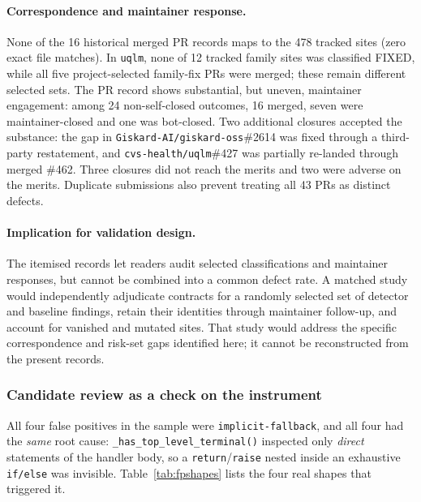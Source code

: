 \documentclass[10pt,a4paper]{article}
\begin{document}
\paragraph{Correspondence and maintainer response.}
None of the 16 historical merged PR records maps to the 478 tracked sites (zero
exact file matches). In \texttt{uqlm}, none of 12 tracked family sites was
classified FIXED, while all five project-selected family-fix PRs were
merged; these remain different selected sets. The PR record shows
substantial, but uneven, maintainer engagement: among 24 non-self-closed
outcomes, 16 merged, seven were maintainer-closed and one was bot-closed.
Two additional closures accepted the substance: the gap in
\texttt{Giskard-AI/giskard-oss}\#2614 was fixed through a third-party
restatement, and \texttt{cvs-health/uqlm}\#427 was partially re-landed
through merged \#462. Three closures did not reach the merits and two
were adverse on the merits. Duplicate submissions also prevent treating
all 43 PRs as distinct defects.

\paragraph{Implication for validation design.}
The itemised records let readers audit selected classifications and
maintainer responses, but cannot be combined into a common defect rate.
A matched study would independently adjudicate contracts for a randomly
selected set of detector and baseline findings, retain their identities
through maintainer follow-up, and account for vanished and mutated sites.
That study would address the specific correspondence and risk-set gaps
identified here; it cannot be reconstructed from the present records.

\subsubsection{Candidate review as a check on the instrument}
\label{sec:rq4}

All four false positives in the sample were \texttt{implicit-fallback}, and all
four had the \emph{same} root cause:
\texttt{\_has\_top\_level\_terminal()} inspected only \emph{direct} statements of
the handler body, so a \texttt{return}/\texttt{raise} nested inside an exhaustive
\texttt{if/else} was invisible. Table~\ref{tab:fpshapes} lists the four real
shapes that triggered it.
\end{document}
